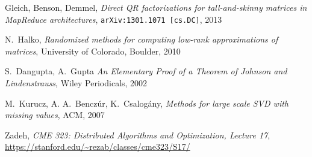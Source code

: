 \documentclass{article}
\begin{document}
\begin{thebibliography}{1}

Gleich, Benson, Demmel, \emph{Direct QR factorizations for tall-and-skinny
  matrices in MapReduce architectures}, {\tt arXiv:1301.1071 [cs.DC]}, 2013

N.~Halko, \emph{Randomized methods for computing low-rank approximations of
  matrices}, University of Colorado, Boulder, 2010

S.~Dangupta, A.~Gupta \emph{An Elementary Proof of a Theorem of Johnson and
  Lindenstrauss}, Wiley Periodicals, 2002

M.~Kurucz, A. A.~Benczúr, K.~Csalogány, \emph{Methods for large scale SVD with
missing values}, ACM, 2007

Zadeh, \emph{CME 323: Distributed Algorithms and Optimization, Lecture 17}, 
\url{https://stanford.edu/~rezab/classes/cme323/S17/}
  
\end{thebibliography}
\end{document}
